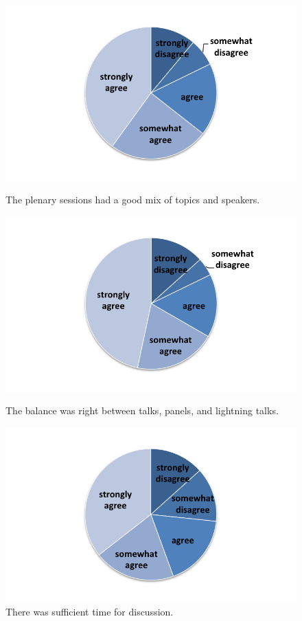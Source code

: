 \begin{figure}[!htb]
  \includegraphics[width=\linewidth]{figures/SurveyFig1rev}
  \caption{The plenary sessions had a good mix of topics and speakers.\label{fig:SFig1}}
\endminipage\hfill
{}
  \includegraphics[width=\linewidth]{figures/SurveyFig2rev}
  \caption{The balance was right between talks, panels, and lightning talks.\label{fig:SFig2}}
\endminipage\hfill
{}%
  \includegraphics[width=\linewidth]{figures/SurveyFig3rev}
  \caption{There was sufficient time for discussion.\label{fig:SFig3}}
\endminipage
\end{figure}

